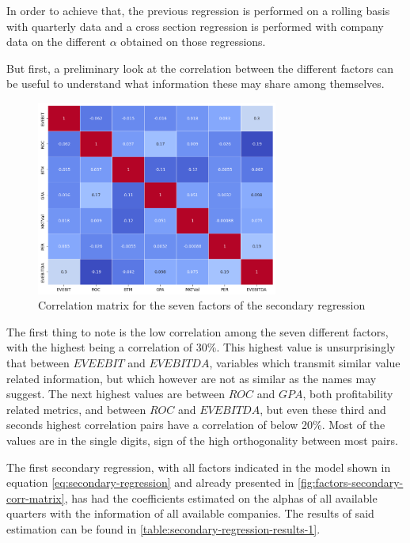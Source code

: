 In order to achieve that, the previous regression is performed on a rolling basis with quarterly data and a cross section regression is performed with company data on the different $\alpha$ obtained on those regressions. 

But first, a preliminary look at the correlation between the different factors can be useful to understand what information these may share among themselves. 

\begin{figure}[ht]
    \centering
    \includegraphics[width=300px]{assets/factors-secondary-corr-matrix.png}
    \caption{Correlation matrix for the seven factors of the secondary regression}
    \label{fig:factors-secondary-corr-matrix}
\end{figure}

The first thing to note is the low correlation among the seven different factors, with the highest being a correlation of 30\%. This highest value is unsurprisingly that between $EVEEBIT$ and $EVEBITDA$, variables which transmit similar value related information, but which however are not as similar as the names may suggest. The next highest values are between $ROC$ and $GPA$, both profitability related metrics, and between $ROC$ and $EVEBITDA$, but even these third and seconds highest correlation pairs have a correlation of below 20\%. Most of the values are in the single digits, sign of the high orthogonality between most pairs. 

The first secondary regression, with all factors indicated in the model shown in equation \eqref{eq:secondary-regression} and already presented in \autoref{fig:factors-secondary-corr-matrix}, has had the coefficients estimated on the alphas of all available quarters with the information of all available companies. The results of said estimation can be found in \autoref{table:secondary-regression-results-1}.

